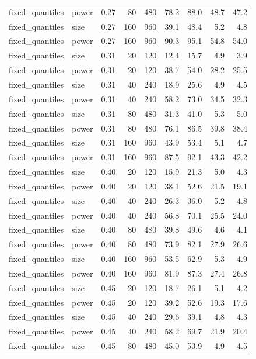 \begin{table}[p]
\begin{tabular}{@{}llrrrrrrr@{}}
fixed\_quantiles & power & 0.27 & 80 & 480 & 78.2 & 88.0 & 48.7 & 47.2 \\
fixed\_quantiles & size & 0.27 & 160 & 960 & 39.1 & 48.4 & 5.2 & 4.8 \\
fixed\_quantiles & power & 0.27 & 160 & 960 & 90.3 & 95.1 & 54.8 & 54.0 \\
fixed\_quantiles & size & 0.31 & 20 & 120 & 12.4 & 15.7 & 4.9 & 3.9 \\
fixed\_quantiles & power & 0.31 & 20 & 120 & 38.7 & 54.0 & 28.2 & 25.5 \\
fixed\_quantiles & size & 0.31 & 40 & 240 & 18.9 & 25.6 & 4.9 & 4.5 \\
fixed\_quantiles & power & 0.31 & 40 & 240 & 58.2 & 73.0 & 34.5 & 32.3 \\
fixed\_quantiles & size & 0.31 & 80 & 480 & 31.3 & 41.0 & 5.3 & 5.0 \\
fixed\_quantiles & power & 0.31 & 80 & 480 & 76.1 & 86.5 & 39.8 & 38.4 \\
fixed\_quantiles & size & 0.31 & 160 & 960 & 43.9 & 53.4 & 5.1 & 4.7 \\
fixed\_quantiles & power & 0.31 & 160 & 960 & 87.5 & 92.1 & 43.3 & 42.2 \\
fixed\_quantiles & size & 0.40 & 20 & 120 & 15.9 & 21.3 & 5.0 & 4.3 \\
fixed\_quantiles & power & 0.40 & 20 & 120 & 38.1 & 52.6 & 21.5 & 19.1 \\
fixed\_quantiles & size & 0.40 & 40 & 240 & 26.3 & 36.0 & 5.2 & 4.8 \\
fixed\_quantiles & power & 0.40 & 40 & 240 & 56.8 & 70.1 & 25.5 & 24.0 \\
fixed\_quantiles & size & 0.40 & 80 & 480 & 39.8 & 49.6 & 4.6 & 4.1 \\
fixed\_quantiles & power & 0.40 & 80 & 480 & 73.9 & 82.1 & 27.9 & 26.6 \\
fixed\_quantiles & size & 0.40 & 160 & 960 & 53.5 & 62.9 & 5.3 & 4.9 \\
fixed\_quantiles & power & 0.40 & 160 & 960 & 81.9 & 87.3 & 27.4 & 26.8 \\
fixed\_quantiles & size & 0.45 & 20 & 120 & 18.7 & 26.1 & 5.1 & 4.2 \\
fixed\_quantiles & power & 0.45 & 20 & 120 & 39.2 & 52.6 & 19.3 & 17.6 \\
fixed\_quantiles & size & 0.45 & 40 & 240 & 29.6 & 39.1 & 4.8 & 4.3 \\
fixed\_quantiles & power & 0.45 & 40 & 240 & 58.2 & 69.7 & 21.9 & 20.4 \\
fixed\_quantiles & size & 0.45 & 80 & 480 & 45.0 & 53.9 & 4.9 & 4.5 \\

\end{tabular}
\end{table}

